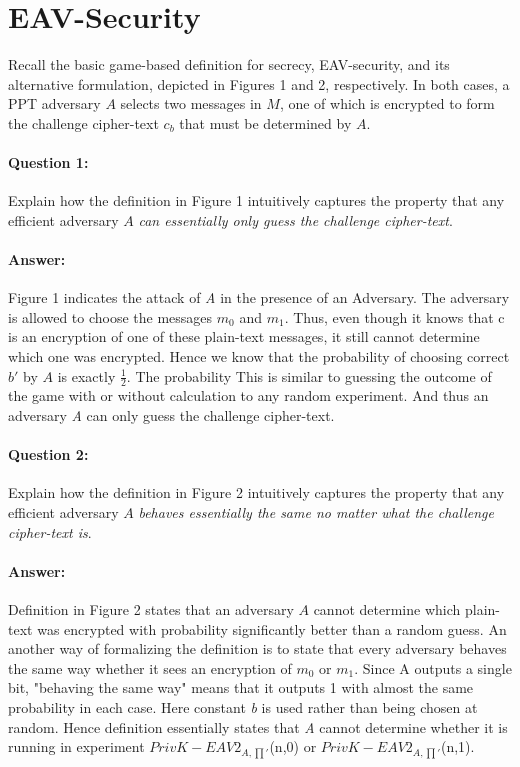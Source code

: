 \documentclass{article}
\begin{document}
\section{EAV-Security}
    Recall the basic game-based definition for secrecy, EAV-security, and its alternative formulation, depicted in Figures 1 and 2, respectively. In both cases, a PPT adversary $\mathit{A}$ selects two messages in $\mathit{M}$, one of which is encrypted to form the challenge cipher-text $c_b$ that must be determined by $\mathit{A}$.
    
    \paragraph{Question 1:} Explain how the definition in Figure 1 intuitively captures the property that any efficient adversary $\mathit{A}$ \emph{can essentially only guess the challenge cipher-text}.
    
    \paragraph{Answer: \newline}
        Figure 1 indicates the attack of \emph{A} in the presence of an Adversary. The adversary is allowed to choose the messages $\mathit{m_0}$ and $\mathit{m_1}$. Thus, even though it knows that c is an encryption of one of these plain-text messages, it still cannot determine which one was encrypted. Hence we know that the probability of choosing correct $b\prime$ by $\mathit{A}$ is exactly $\frac{1}{2}$. The probability  This is similar to guessing the outcome of the game with or without calculation to any random experiment. And thus an adversary \emph{A} can only guess the challenge cipher-text. \cite{section2question12}
    
    \paragraph{Question 2:} Explain how the definition in Figure 2 intuitively captures the property that any efficient adversary $\mathit{A}$ \emph{behaves essentially the same no matter what the challenge cipher-text is}.
    \paragraph{Answer: \newline}
        Definition in Figure 2 states that an adversary $\mathit{A}$ cannot determine which plain-text was encrypted with probability significantly better than a random guess. An another way of formalizing the definition is to state that every adversary behaves the same way whether it sees an encryption of $\mathit{m_0}$ or $\mathit{m_1}$. Since A outputs a single bit, "behaving the same way" means that it outputs 1 with almost the same probability in each case. Here constant \emph{b} is used rather than being chosen at random. Hence definition essentially states that \emph{A} cannot determine whether it is running in experiment $PrivK-EAV2_{A,\prod'}$(n,0) or $PrivK-EAV2_{A,\prod'}$(n,1).
    
\end{document}
